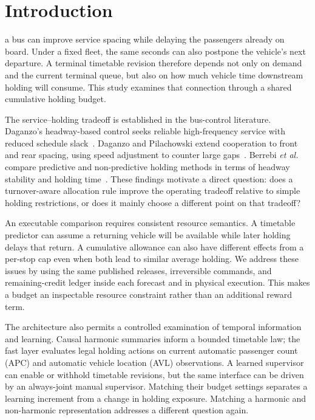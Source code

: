 \section{Introduction}
 a bus can improve service spacing while delaying the passengers already on board. Under a fixed fleet, the same seconds can also postpone the vehicle's next departure. A terminal timetable revision therefore depends not only on demand and the current terminal queue, but also on how much vehicle time downstream holding will consume. This study examines that connection through a shared cumulative holding budget.

The service--holding tradeoff is established in the bus-control literature. Daganzo's headway-based control seeks reliable high-frequency service with reduced schedule slack~\cite{daganzo2009headway}. Daganzo and Pilachowski extend cooperation to front and rear spacing, using speed adjustment to counter large gaps~\cite{daganzo2011cooperation}. Berrebi \emph{et al.} compare predictive and non-predictive holding methods in terms of headway stability and holding time~\cite{berrebi2018comparing}. These findings motivate a direct question: does a turnover-aware allocation rule improve the operating tradeoff relative to simple holding restrictions, or does it mainly choose a different point on that tradeoff?

An executable comparison requires consistent resource semantics. A timetable predictor can assume a returning vehicle will be available while later holding delays that return. A cumulative allowance can also have different effects from a per-stop cap even when both lead to similar average holding. We address these issues by using the same published releases, irreversible commands, and remaining-credit ledger inside each forecast and in physical execution. This makes a budget an inspectable resource constraint rather than an additional reward term.

The architecture also permits a controlled examination of temporal information and learning. Causal harmonic summaries inform a bounded timetable law; the fast layer evaluates legal holding actions on current automatic passenger count (APC) and automatic vehicle location (AVL) observations. A learned supervisor can enable or withhold timetable revisions, but the same interface can be driven by an always-joint manual supervisor. Matching their budget settings separates a learning increment from a change in holding exposure. Matching a harmonic and non-harmonic representation addresses a different question again.

